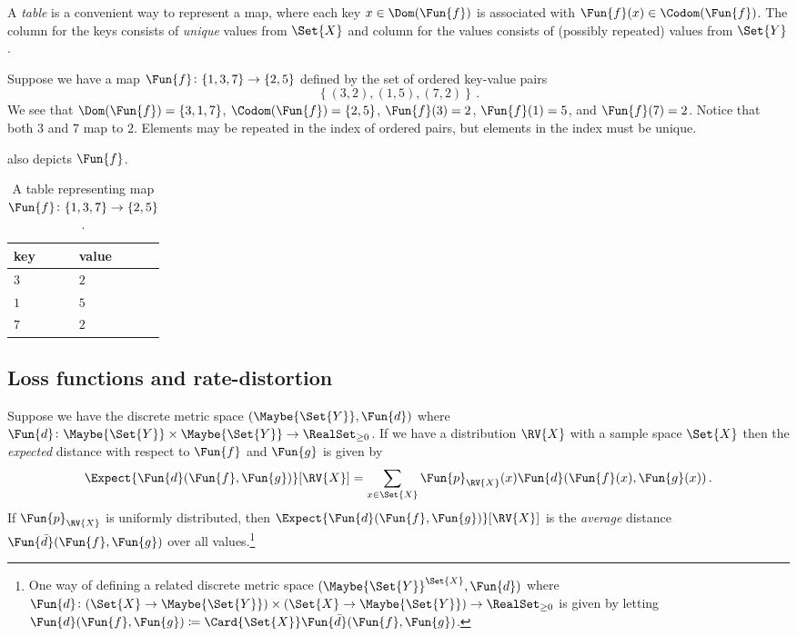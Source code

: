\documentclass[ ../main.tex]{subfiles}
\begin{document}
A \emph{table} is a convenient way to represent a map, where each key $x \in \Dom(\Fun{f})$ is associated with $\Fun{f}(x) \in \Codom(\Fun{f})$. The column for the keys consists of \emph{unique} values from $\Set{X}$ and column for the values consists of (possibly repeated) values from $\Set{Y}$.
\begin{example}
	Suppose we have a map $\Fun{f} \colon \{1,3,7\} \to \{2,5\}$ defined by the set of ordered key-value pairs
	\begin{equation}
	\left\{(3,2),(1,5),(7,2)\right\}\,.
	\end{equation}
	We see that $\Dom(\Fun{f}) = \{3,1,7\}$, $\Codom(\Fun{f}) = \{2,5\}$, $\Fun{f}(3) = 2$, $\Fun{f}(1) = 5$, and $\Fun{f}(7) = 2$. Notice that both $3$ and $7$ map to $2$. Elements may be repeated in the  index of ordered pairs, but elements in the  index must be unique.

	 also depicts $\Fun{f}$.
	\begin{table}[h]
		\centering
		\caption{A table representing map $\Fun{f} \colon \{1,3,7\} \to \{2,5\}$.}
		\label{tbl:tabfunc}
		\begin{tabular}{@{} l l @{}}
			\toprule
			key & value\\
			\midrule
			$3$ & $2$\\
			$1$ & $5$\\
			$7$ & $2$\\
			\bottomrule
		\end{tabular}
	\end{table}
\end{example}

\subsection{Loss functions and rate-distortion}
\label{sec:error}
Suppose we have the discrete metric space $(\Maybe{\Set{Y}}, \Fun{d})$ where $\Fun{d} \colon \Maybe{\Set{Y}} \times \Maybe{\Set{Y}} \to \RealSet_{\geq 0}$.
If we have a distribution $\RV{X}$ with a sample space $\Set{X}$ then the \emph{expected} distance with respect to $\Fun{f}$ and $\Fun{g}$ is given by
\begin{equation}
\Expect{\Fun{d}(\Fun{f},\Fun{g})}[\RV{X}] = \sum_{x \in \Set{X}} \Fun{p}_{\RV{X}}(x) \Fun{d}(\Fun{f}(x),\Fun{g}(x))\,.
\end{equation}
If $\Fun{p}_{\RV{X}}$ is uniformly distributed, then $\Expect{\Fun{d}(\Fun{f},\Fun{g})}[\RV{X}]$ is the \emph{average} distance $\Fun{\bar{d}}(\Fun{f},\Fun{g})$ over all values.\footnote{One way of defining a related discrete metric space $(\Maybe{\Set{Y}}^{\Set{X}}, \Fun{d})$ where $\Fun{d} \colon (\Set{X} \to \Maybe{\Set{Y}}) \times (\Set{X} \to \Maybe{\Set{Y}}) \to \RealSet_{\geq 0}$ is given by letting $\Fun{d}(\Fun{f},\Fun{g}) \coloneqq \Card{\Set{X}} \Fun{\bar{d}}(\Fun{f},\Fun{g})$.}
\end{document}
